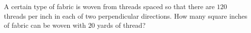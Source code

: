 A certain type of fabric is woven from threads spaced so that there are $120$ threads per inch in each of two perpendicular directions. How many square inches of fabric can be woven with $20$ yards of thread?
